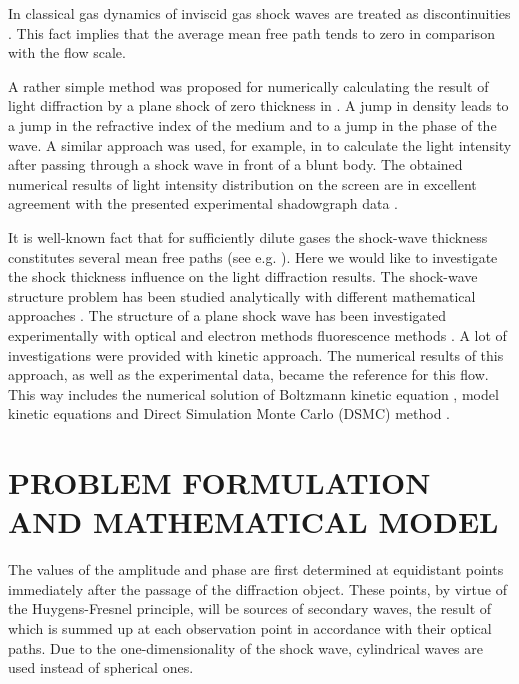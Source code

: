 \documentclass{aip-cp}
\begin{document}
In classical gas dynamics of inviscid gas shock waves are treated as discontinuities \citep{Sedov,LANDAU1987}. This fact implies that the average mean free path tends to zero in comparison with the flow scale. 

A rather simple method was proposed for numerically calculating the result of light diffraction by a plane shock of zero thickness in \cite{Pfeifer}. A jump in density leads to a jump in the refractive index of the medium and to a jump in the phase of the wave. A similar approach was used, for example, in \cite{Panda_1995} to calculate the light intensity after passing through a shock wave in front of a blunt body. The obtained numerical results of light intensity distribution on the screen are in excellent agreement with the presented experimental shadowgraph data \cite{Pfeifer,Panda_1995}.

It is well-known fact that for sufficiently dilute gases the shock-wave thickness constitutes several mean free paths (see e.g. \cite{Kogan, Cercignani_book}). Here we would like to investigate the shock thickness influence on the light diffraction results. The shock-wave structure problem has been studied analytically with different mathematical approaches \cite{Becker_1922, Mott-Smith_1951, Salwen_1964, Holway_1964, Yen_1966}. The structure of a plane shock wave has been investigated experimentally with optical and electron methods fluorescence methods \cite{Hornig_1950, Hansen_Hornig_1960, Robben, Alsmeyer_1976, Pham-Van-Diep624}. A lot of investigations were provided with kinetic approach. The numerical results of this approach, as well as the experimental data, became the reference for this flow. This way includes the numerical solution of Boltzmann kinetic equation  \citep{Ohwada_shock, Dodulad_Tcheremissine_2013, ShockWaves_2015}, model kinetic equations \citep{Shakhov, Rykov2008} and Direct Simulation Monte Carlo (DSMC) method \citep{Belotserkovskii, Pham-Van-Diep624, Erofeev_Friedlander_overshoot_2002, overshoot_2015}.

\section{PROBLEM FORMULATION AND MATHEMATICAL MODEL}

The values of the amplitude and phase are first determined at equidistant points immediately after the passage of the diffraction object. These points, by virtue of the Huygens-Fresnel principle, will be sources of secondary waves, the result of which is summed up at each observation point in accordance with their optical paths. Due to the one-dimensionality of the shock wave, cylindrical waves are used instead of spherical ones.
\end{document}

